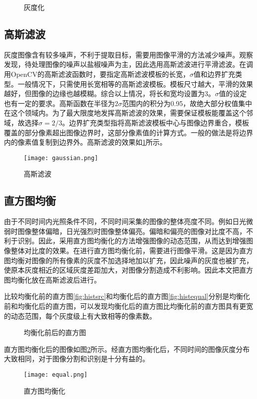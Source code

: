 \begin{figure}[h]
  \centering
  \hspace{1in}
  \caption{灰度化}
\end{figure}

\subsection{高斯滤波}


灰度图像含有较多噪声，不利于提取目标，需要用图像平滑的方法减少噪声。观察发现，待处理图像的噪声以盐椒噪声为主，因此选用高斯滤波进行平滑滤波。在调用OpenCV的高斯滤波函数时，要指定高斯滤波模板的长宽，$\sigma$值和边界扩充类型。一般情况下，只需使用长宽相等的高斯滤波模板。模板尺寸越大，平滑的效果越好，但图像的边缘也越模糊。综合以上情况，将长和宽均设置为3。$\sigma$值的设定也有一定的要求。高斯函数在半径为$2\sigma$范围内的积分为0.95，故绝大部分权值集中在这个领域内。为了最大限度地发挥高斯滤波的效果，需要保证模板能覆盖这个邻域，故选择$\sigma=2/3$。边界扩充类型指将高斯滤波模板中心与图像边界重合，模板覆盖的部分像素超出图像边界时，这部分像素值的计算方式。一般的做法是将边界内的像素值复制到边界外。高斯滤波的效果如\ref{fig:gauss}所示。
\begin{figure}[h]
  \centering
  \texttt{[image: gaussian.png]}
  \caption{高斯滤波}
  \label{fig:gauss}
\end{figure}

\subsection{直方图均衡}


由于不同时间内光照条件不同，不同时间采集的图像的整体亮度不同。例如日光微弱时图像整体偏暗，日光强烈时图像整体偏亮。偏暗和偏亮的图像对比度不高，不利于识别。因此，采用直方图均衡化的方法增强图像的动态范围，从而达到增强图像整体对比度的效果。在进行直方图均衡化前，需要进行图像平滑。这是因为直方图均衡对图像的所有像素的灰度不加选择地加以扩充，因此噪声的灰度也被扩充，使原本灰度相近的区域灰度差距加大，对图像分割造成不利影响。因此本文把直方图均衡化放在高斯滤波后进行。

比较均衡化前的直方图\ref{fig:histsrc}和均衡化后的直方图\ref{fig:histequal}分别是均衡化前和均衡化后的直方图，可以发现均衡化后的直方图比均衡化前的直方图具有更宽的动态范围，每个灰度级上有大致相等的像素数。
\begin{figure}[h]
  \centering
  \caption{均衡化前后的直方图}
\end{figure}
直方图均衡化后的图像如图\ref{fig:equal}所示。经直方图均衡化后，不同时间的图像灰度分布大致相同，对于图像分割和识别是十分有益的。
\begin{figure}[h]
  \centering
  \texttt{[image: equal.png]}
  \caption{直方图均衡化}
  \label{fig:equal}
\end{figure}



